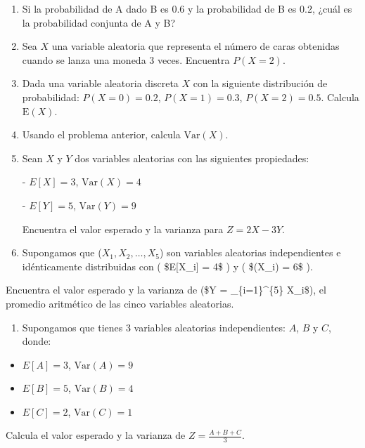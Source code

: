 \documentclass[
  letterpaper,
  DIV=11,
  numbers=noendperiod]{scrartcl}
\providecommand{\tightlist}{%
  \setlength{\itemsep}{0pt}\setlength{\parskip}{0pt}}\usepackage{longtable,booktabs,array}
\begin{document}
\begin{enumerate}
\item
  Si la probabilidad de A dado B es 0.6 y la probabilidad de B es 0.2,
  ¿cuál es la probabilidad conjunta de A y B?
\item
  Sea \(X\) una variable aleatoria que representa el número de caras
  obtenidas cuando se lanza una moneda 3 veces. Encuentra \(P(X = 2)\).
\item
  Dada una variable aleatoria discreta \(X\) con la siguiente
  distribución de probabilidad: \(P(X = 0) = 0.2\), \(P(X = 1) = 0.3\),
  \(P(X = 2) = 0.5\). Calcula \(\text{E}(X)\).
\item
  Usando el problema anterior, calcula \(\text{Var}(X)\).
\item
  Sean \(X\) y \(Y\) dos variables aleatorias con las siguientes
  propiedades:

  - \(E[X] = 3\), \(\text{Var}(X) = 4\)

  - \(E[Y] = 5\), \(\text{Var}(Y) = 9\)

  Encuentra el valor esperado y la varianza para \(Z = 2X - 3Y\).
\item
  Supongamos que (\(X_1, X_2, \ldots, X_5\)) son variables aleatorias
  independientes e idénticamente distribuidas con ( \$E{[}X\_i{]} = 4\$
  ) y ( \$(X\_i) = 6\$ ).
\end{enumerate}

Encuentra el valor esperado y la varianza de (\$Y = 
\sum\_\{i=1\}\^{}\{5\} X\_i\$), el promedio aritmético de las cinco
variables aleatorias.

\begin{enumerate}
\def\labelenumi{\arabic{enumi}.}
\setcounter{enumi}{15}
\tightlist
\item
  Supongamos que tienes 3 variables aleatorias independientes: \(A\),
  \(B\) y \(C\), donde:
\end{enumerate}

\begin{itemize}
\item
  \(E[A] = 3\), \(\text{Var}(A) = 9\)
\item
  \(E[B] = 5\), \(\text{Var}(B) = 4\)
\item
  \(E[C] = 2\), \(\text{Var}(C) = 1\)
\end{itemize}

Calcula el valor esperado y la varianza de \(Z = \frac{A + B + C}{3}\).
\end{document}
